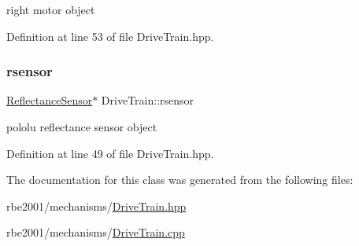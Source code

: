 right motor object 



Definition at line 53 of file Drive\+Train.\+hpp.

\mbox{\label{class_drive_train_a90f1f3d3f42a0ac4082df8e37541b71f}} 
\subsubsection{\texorpdfstring{rsensor}{rsensor}}
{\footnotesize\ttfamily \hyperlink{class_reflectance_sensor}{Reflectance\+Sensor}$\ast$ Drive\+Train\+::rsensor\hspace{0.3cm}{\ttfamily [private]}}



pololu reflectance sensor object 



Definition at line 49 of file Drive\+Train.\+hpp.



The documentation for this class was generated from the following files\+:\begin{DoxyCompactItemize}
\item 
rbe2001/mechanisms/\hyperlink{_drive_train_8hpp}{Drive\+Train.\+hpp}\item 
rbe2001/mechanisms/\hyperlink{_drive_train_8cpp}{Drive\+Train.\+cpp}\end{DoxyCompactItemize}
